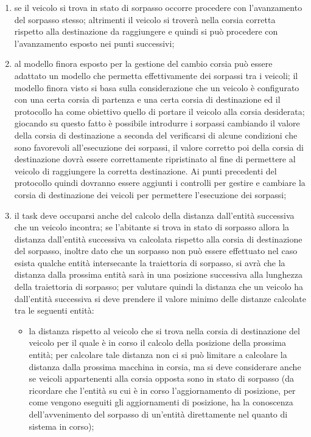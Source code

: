 \begin{enumerate}
\begin{enumerate}
\item se il veicolo si trova in stato di sorpasso occorre procedere con l'avanzamento del sorpasso stesso; altrimenti il veicolo si troverà nella corsia corretta rispetto alla destinazione da raggiungere e quindi si può procedere con l'avanzamento esposto nei punti successivi;  
\item al modello finora esposto per la gestione del cambio corsia può essere adattato un modello che permetta effettivamente dei sorpassi tra i veicoli; il modello finora visto si basa sulla considerazione che un veicolo è configurato con una certa corsia di partenza e una certa corsia di destinazione ed il protocollo ha come obiettivo quello di portare il veicolo alla corsia desiderata; giocando su questo fatto è possibile introdurre i sorpassi cambiando il valore della corsia di destinazione a seconda del verificarsi di alcune condizioni che sono favorevoli all'esecuzione dei sorpassi, il valore corretto poi della corsia di destinazione dovrà essere correttamente ripristinato al fine di permettere al veicolo di raggiungere la corretta destinazione. Ai punti precedenti del protocollo quindi dovranno essere aggiunti i controlli per gestire e cambiare la corsia di destinazione dei veicoli per permettere l'esecuzione dei sorpassi;
\item il task deve occuparsi anche del calcolo della distanza dall'entità successiva che un veicolo incontra; se l'abitante si trova in stato di sorpasso allora la distanza dall'entità successiva va calcolata rispetto alla corsia di destinazione del sorpasso, inoltre dato che un sorpasso non può essere effettuato nel caso esista qualche entità intersecante la traiettoria di sorpasso, si avrà che la distanza dalla prossima entità sarà in una posizione successiva alla lunghezza della traiettoria di sorpasso;
per valutare quindi la distanza che un veicolo ha dall'entità successiva si deve prendere il valore minimo delle distanze calcolate tra le seguenti entità:
\begin{itemize}
\item la distanza rispetto al veicolo che si trova nella corsia di destinazione del veicolo per il quale è in corso il calcolo della posizione della prossima entità; per calcolare tale distanza non ci si può limitare a calcolare la distanza dalla prossima macchina in corsia, ma si deve considerare anche se veicoli appartenenti alla corsia opposta sono in stato di sorpasso (da ricordare che l'entità su cui è in corso l'aggiornamento di posizione, per come vengono eseguiti gli aggiornamenti di posizione, ha la conoscenza dell'avvenimento del sorpasso di un'entità direttamente nel quanto di sistema in corso);

\end{itemize}
\end{enumerate}
\end{enumerate}
